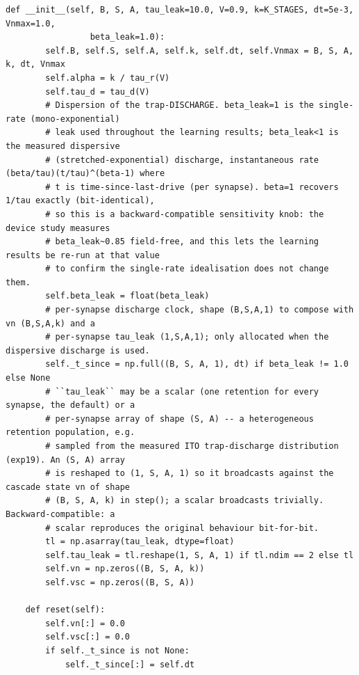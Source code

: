 \begin{lstlisting}[caption={mrl\_trace/bandit.py},label={lst:siox-src-bandit}]
    def __init__(self, B, S, A, tau_leak=10.0, V=0.9, k=K_STAGES, dt=5e-3, Vnmax=1.0,
                 beta_leak=1.0):
        self.B, self.S, self.A, self.k, self.dt, self.Vnmax = B, S, A, k, dt, Vnmax
        self.alpha = k / tau_r(V)
        self.tau_d = tau_d(V)
        # Dispersion of the trap-DISCHARGE. beta_leak=1 is the single-rate (mono-exponential)
        # leak used throughout the learning results; beta_leak<1 is the measured dispersive
        # (stretched-exponential) discharge, instantaneous rate (beta/tau)(t/tau)^(beta-1) where
        # t is time-since-last-drive (per synapse). beta=1 recovers 1/tau exactly (bit-identical),
        # so this is a backward-compatible sensitivity knob: the device study measures
        # beta_leak~0.85 field-free, and this lets the learning results be re-run at that value
        # to confirm the single-rate idealisation does not change them.
        self.beta_leak = float(beta_leak)
        # per-synapse discharge clock, shape (B,S,A,1) to compose with vn (B,S,A,k) and a
        # per-synapse tau_leak (1,S,A,1); only allocated when the dispersive discharge is used.
        self._t_since = np.full((B, S, A, 1), dt) if beta_leak != 1.0 else None
        # ``tau_leak`` may be a scalar (one retention for every synapse, the default) or a
        # per-synapse array of shape (S, A) -- a heterogeneous retention population, e.g.
        # sampled from the measured ITO trap-discharge distribution (exp19). An (S, A) array
        # is reshaped to (1, S, A, 1) so it broadcasts against the cascade state vn of shape
        # (B, S, A, k) in step(); a scalar broadcasts trivially. Backward-compatible: a
        # scalar reproduces the original behaviour bit-for-bit.
        tl = np.asarray(tau_leak, dtype=float)
        self.tau_leak = tl.reshape(1, S, A, 1) if tl.ndim == 2 else tl
        self.vn = np.zeros((B, S, A, k))
        self.vsc = np.zeros((B, S, A))

    def reset(self):
        self.vn[:] = 0.0
        self.vsc[:] = 0.0
        if self._t_since is not None:
            self._t_since[:] = self.dt


\end{lstlisting}
